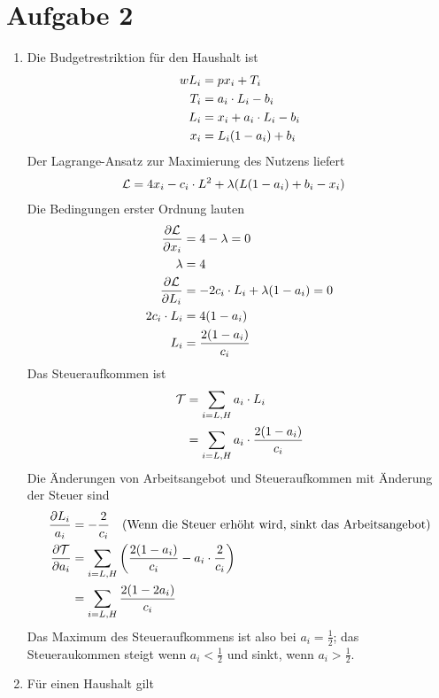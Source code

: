 \documentclass{article}
\begin{document}
	\section*{Aufgabe 2}
	\begin{enumerate}[label=(\alph*)]
		\item Die Budgetrestriktion für den Haushalt ist
		\begin{align}
			wL_i &= px_i + T_i \notag \\
			T_i &= a_i\cdot L_i - b_i \notag \\
			L_i &= x_i + a_i\cdot L_i - b_i \notag \\
			x_i &= L_i(1-a_i) + b_i \notag
		\end{align}
		Der Lagrange-Ansatz zur Maximierung des Nutzens liefert
		\begin{align}
			\mathcal{L} &= 4x_i - c_i\cdot L^2 + \lambda(L(1-a_i)+b_i-x_i) \notag
		\end{align}
		Die Bedingungen erster Ordnung lauten
		\begin{align}
			\frac{\partial\mathcal{L}}{\partial x_i} &= 4-\lambda =0 \notag \\
			\lambda &= 4 \notag \\
			\frac{\partial\mathcal{L}}{\partial L_i} &= -2c_i\cdot L_i + \lambda(1-a_i) =0 \notag \\
			2c_i\cdot L_i &= 4(1-a_i) \notag \\
			L_i &= \frac{2(1-a_i)}{c_i} \notag
		\end{align}
		Das Steueraufkommen ist
		\begin{align}
			\mathcal{T} &= \sum_{i=L,H} a_i\cdot L_i \notag \\
			&= \sum_{i=L,H} a_i\cdot\frac{2(1-a_i)}{c_i} \notag
		\end{align}
		Die Änderungen von Arbeitsangebot und Steueraufkommen mit Änderung der Steuer sind
		\begin{align}
			\frac{\partial L_i}{a_i} &= -\frac{2}{c_i} \quad(\text{Wenn die Steuer erhöht wird, sinkt das Arbeitsangebot}) \notag \\
			\frac{\partial \mathcal{T}}{\partial a_i} &= \sum_{i=L,H} \left(\frac{2(1-a_i)}{c_i} - a_i\cdot\frac{2}{c_i}\right) \notag \\
			&= \sum_{i=L,H} \frac{2(1-2a_i)}{c_i} \notag
		\end{align}
		Das Maximum des Steueraufkommens ist also bei $a_i=\frac{1}{2}$; das Steueraukommen steigt wenn $a_i<\frac{1}{2}$ und sinkt, wenn $a_i>\frac{1}{2}$.
		\item Für einen Haushalt gilt

\end{enumerate}
\end{document}

